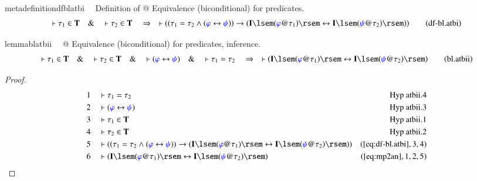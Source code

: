 \begin{restatable}{metadefinition}{dfblatbi}~~ Definition of @ Equivalence
(biconditional) for predicates.
\begin{align}
\vdash \tau_1 \in \mathbf{T}\quad\&\quad \vdash \tau_2 \in
    \mathbf{T}\quad\Rightarrow\quad \vdash ( ( \tau_1 = \tau_2 \wedge (
    \mw{\varphi} \leftrightarrow \mw{\psi} ) ) \rightarrow ( \mathbf{I} \lsem (
    \mw{\varphi} @ \tau_1 ) \rsem \leftrightarrow \mathbf{I} \lsem ( \mw{\psi}
    @ \tau_2 ) \rsem ) )\label{eq:df-bl.atbi}\tag{df-bl.atbi}
\end{align}
\end{restatable}

\begin{restatable}{lemma}{blatbii}~~ @ Equivalence (biconditional) for
predicates, inference.
\begin{align}
\vdash \tau_1 \in \mathbf{T}\quad\&\quad \vdash \tau_2 \in
    \mathbf{T}\quad\&\quad \vdash ( \mw{\varphi} \leftrightarrow \mw{\psi}
    )\quad\&\quad \vdash \tau_1 = \tau_2\quad\Rightarrow\quad \vdash (
    \mathbf{I} \lsem ( \mw{\varphi} @ \tau_1 ) \rsem \leftrightarrow \mathbf{I}
    \lsem ( \mw{\psi} @ \tau_2 ) \rsem )\label{eq:bl.atbii}\tag{bl.atbii}
\end{align}
\end{restatable}

\begin{proof}
\begin{align}
  1 &&  & \vdash \tau_1 = \tau_2&\text{Hyp~atbii.4}\notag%
  \\ 2 &&  & \vdash ( \mw{\varphi} \leftrightarrow \mw{\psi}
      )&\text{Hyp~atbii.3}\notag%
  \\ 3 &&  & \vdash \tau_1 \in \mathbf{T}&\text{Hyp~atbii.1}\notag%
  \\ 4 &&  & \vdash \tau_2 \in \mathbf{T}&\text{Hyp~atbii.2}\notag%
  \\ 5 &&  & \vdash ( ( \tau_1 = \tau_2 \wedge ( \mw{\varphi} \leftrightarrow
      \mw{\psi} ) ) \rightarrow ( \mathbf{I} \lsem (
      \mw{\varphi} @ \tau_1 ) \rsem \leftrightarrow
      \mathbf{I} \lsem ( \mw{\psi} @ \tau_2 ) \rsem )
      )&(\mbox{\ref{eq:df-bl.atbi}},3,4)\notag
  \\ 6 &&  & \vdash ( \mathbf{I} \lsem ( \mw{\varphi} @ \tau_1 ) \rsem
      \leftrightarrow \mathbf{I} \lsem ( \mw{\psi} @ \tau_2
      ) \rsem )&(\mbox{\ref{eq:mp2an}},1,2,5)\notag
\end{align}
\end{proof}

